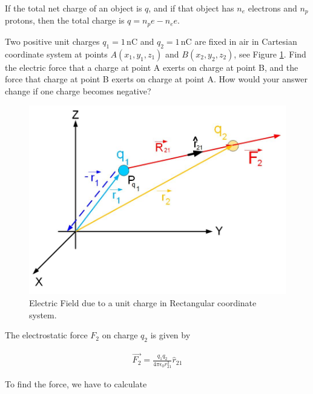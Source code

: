 \documentclass{ximera}
\begin{document}
If the total net charge of an object is $q$, and if that object has $n_e$ electrons and $n_p$ protons, then the total charge is $q=n_p e-n_e e$. 



\begin{example} 
Two positive unit charges $q_1=1$\,nC and $q_2=1$\,nC are fixed in air in Cartesian coordinate system at points $A(x_1,y_1,z_1)$ and $B(x_2,y_2,z_2)$, see Figure \ref{FigTwoCharges}. Find the electric force that a charge at point A exerts on charge at point B, and the force that charge at point B exerts on charge at point A. How would your answer change if one charge becomes negative? 



\begin{figure}[htbp]
\begin{center}
\includegraphics[scale=0.5]{../jpg/twochargecartcoordFORCE.jpg}
\end{center}
\caption{Electric Field due to a unit charge in Rectangular coordinate system.}
\label{FigTwoCharges}
\end{figure}

\begin{explanation}

The electrostatic force $F_2$ on charge $q_2$ is given by 




\begin{eqnarray}
\vec{F_2}=\frac{q_1 q_2}{4 \pi \epsilon_0 r_{21}^2} \hat{r}_{21}
\end{eqnarray}

 To find the force, we have to calculate


\end{explanation}
\end{example}
\end{document}
